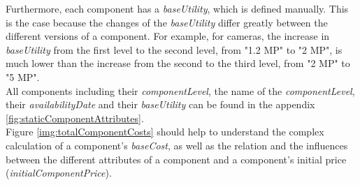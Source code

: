 Furthermore, each component has a \textit{baseUtility}, which is defined manually. This is the case because the changes of the \textit{baseUtility} differ greatly between the different versions of a component. For example, for cameras, the increase in \textit{baseUtility} from the first level to the second level, from "1.2 MP" to "2 MP", is much lower than the increase from the second to the third level, from "2 MP" to "5 MP".\\
All components including their \textit{componentLevel}, the name of the \textit{componentLevel}, their \textit{availabilityDate} and their \textit{baseUtility} can be found in the appendix \ref{fig:staticComponentAttributes}.\\
Figure \ref{img:totalComponentCosts} should help to understand the complex calculation of a component's \textit{baseCost}, as well as the relation and the influences between the different attributes of a component and a component’s initial price (\textit{initialComponentPrice}).\\

